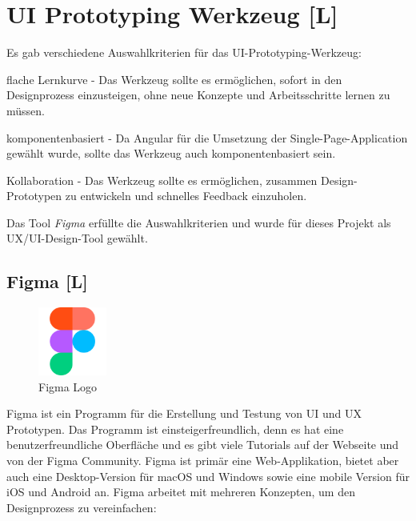 \section{UI Prototyping Werkzeug [L]}
Es gab verschiedene Auswahlkriterien für das UI-Prototyping-Werkzeug: 
\begin{compactitem}
  \item flache Lernkurve - Das Werkzeug sollte es ermöglichen, sofort in den Designprozess einzusteigen, ohne neue Konzepte und Arbeitsschritte lernen zu müssen.
  \item komponentenbasiert - Da Angular für die Umsetzung der Single-Page-Application gewählt wurde, sollte das Werkzeug auch komponentenbasiert sein.
  \item Kollaboration - Das Werkzeug sollte es ermöglichen, zusammen Design-Prototypen zu entwickeln und schnelles Feedback einzuholen.
\end{compactitem}

Das Tool \emph{Figma} erfüllte die Auswahlkriterien und wurde für dieses Projekt als UX/UI-Design-Tool gewählt.

\subsection{Figma [L]}
\label{ch::technologies::figma}

\begin{figure}
  \begin{center}
    \includegraphics[width=0.2\textwidth]{pics/figma_logo.png}
   \caption{Figma Logo}
  \end{center}
\end{figure}

Figma ist ein Programm für die Erstellung und Testung von UI und UX Prototypen. Das Programm ist einsteigerfreundlich, denn es hat eine benutzerfreundliche Oberfläche und es gibt viele Tutorials auf der Webseite und von der Figma Community. Figma ist primär eine Web-Applikation, bietet aber auch eine Desktop-Version für macOS und Windows sowie eine mobile Version für iOS und Android an. Figma arbeitet mit mehreren Konzepten, um den Designprozess zu vereinfachen:

